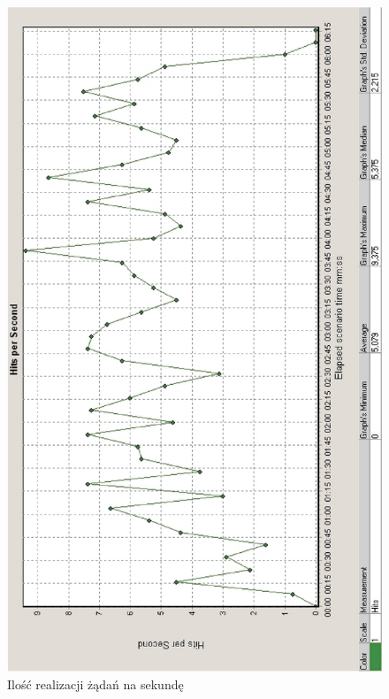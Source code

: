 \begin{figure}[h]
\centering
\includegraphics[width=4.5in]{./rysunki/raport2calybokiem.eps}
\caption{Ilość realizacji żądań na sekundę}
\label{zadania_sekunde}
\end{figure}
